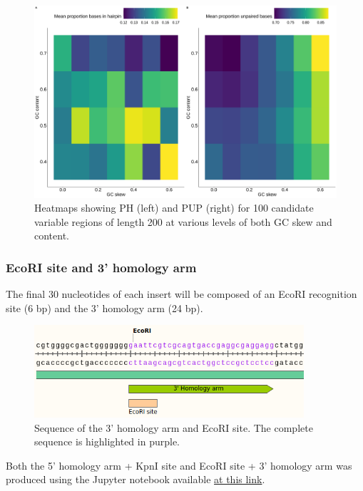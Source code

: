 \documentclass[11pt]{article}
\begin{document}
\begin{figure}[H]
	\includegraphics[width=14cm]{images/plots/rna_secondary_structure_temp.png}
	\centering
	\caption{Heatmaps showing PH (left) and PUP (right) for 100 candidate variable regions of length 200 at various levels of both GC skew and content.}
	\label{fig:rna_secondary_structure}
\end{figure}


\subsubsection{EcoRI site and 3' homology arm}

The final 30 nucleotides of each insert will be composed of an EcoRI recognition site (6 bp) and the 3' homology arm (24 bp). 

\begin{figure}[H]
	\includegraphics[width=10cm]{images/variable_region/3_homology_arm.png}
	\centering
	\caption{Sequence of the 3' homology arm and EcoRI site. The complete sequence is highlighted in purple.}
	\label{fig:3_prime_arm}
\end{figure}

Both the 5' homology arm + KpnI site and EcoRI site + 3' homology arm was produced using the Jupyter notebook available \href{https://github.com/EthanHolleman/plasmid-VR-design/blob/main/notes/homology_arms.ipynb}{at this link}.
\end{document}
